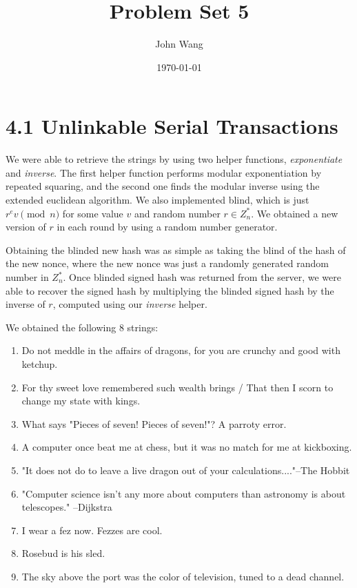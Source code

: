 \documentclass{article}
\title{Problem Set 5}
\author{John Wang}
\date{\today}
\begin{document}
\maketitle

\section{4.1 Unlinkable Serial Transactions}

We were able to retrieve the strings by using two helper functions, \emph{exponentiate} and \emph{inverse}. The first helper function performs modular exponentiation by repeated squaring, and the second one finds the modular inverse using the extended euclidean algorithm. We also implemented blind, which is just $r^e v \pmod{n}$ for some value $v$ and random number $r \in Z_{n}^*$. We obtained a new version of $r$ in each round by using a random number generator.

Obtaining the blinded new hash was as simple as taking the blind of the hash of the new nonce, where the new nonce was just a randomly generated random number in $Z_{n}^*$. Once blinded signed hash was returned from the server, we were able to recover the signed hash by multiplying the blinded signed hash by the inverse of $r$, computed using our \emph{inverse} helper.

We obtained the following 8 strings:

\begin{enumerate}
  \item Do not meddle in the affairs of dragons, for you are crunchy and good with ketchup.
  \item For thy sweet love remembered such wealth brings / That then I scorn to change my state with kings.
  \item What says "Pieces of seven!  Pieces of seven!"?  A parroty error.
  \item A computer once beat me at chess, but it was no match for me at kickboxing.
  \item "It does not do to leave a live dragon out of your calculations...."--The Hobbit
  \item "Computer science isn't any more about computers than astronomy is about telescopes." --Dijkstra
  \item I wear a fez now.  Fezzes are cool.
  \item Rosebud is his sled.
  \item The sky above the port was the color of television, tuned to a dead channel.
\end{enumerate}
\end{document}
